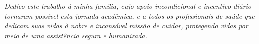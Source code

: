 \begin{dedicatoria}
   \vspace*{\fill}
   \centering
   \noindent
   \textit{Dedico este trabalho à minha família, cujo apoio incondicional e incentivo diário tornaram possível esta jornada acadêmica, e a todos os profissionais de saúde que dedicam suas vidas à nobre e incansável missão de cuidar, protegendo vidas por meio de uma assistência segura e humanizada.} \vspace*{\fill}
\end{dedicatoria}